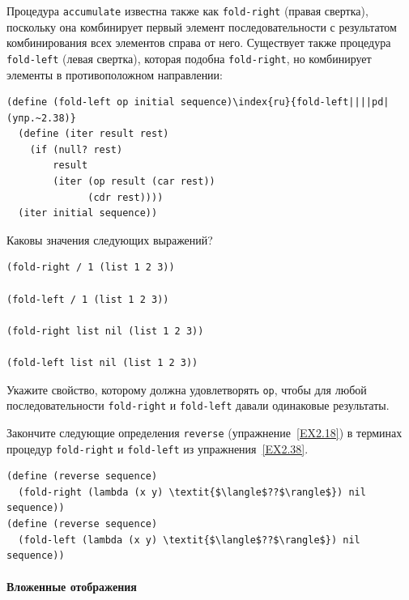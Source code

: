 \begin{exercise}{2.38}\label{EX2.38}%
Процедура
{\tt accumulate} известна также как
{\tt fold-right}
(правая свертка), поскольку она комбинирует
первый элемент последовательности с результатом комбинирования всех
элементов справа от него.  Существует также процедура
{\tt fold-left} (левая свертка), которая подобна
{\tt fold-right}, но комбинирует элементы в противоположном
направлении:

\begin{Verbatim}[fontsize=\small]
(define (fold-left op initial sequence)\index{ru}{fold-left||||pd|(упр.~2.38)}
  (define (iter result rest)
    (if (null? rest)
        result
        (iter (op result (car rest))
              (cdr rest))))
  (iter initial sequence))
\end{Verbatim}
Каковы значения следующих выражений?

\begin{Verbatim}[fontsize=\small]
(fold-right / 1 (list 1 2 3))

(fold-left / 1 (list 1 2 3))

(fold-right list nil (list 1 2 3))

(fold-left list nil (list 1 2 3))
\end{Verbatim}
Укажите свойство, которому должна удовлетворять {\tt op}, чтобы 
для любой последовательности {\tt fold-right} и
{\tt fold-left} давали одинаковые результаты.
\end{exercise}
\begin{exercise}{2.39}\label{EX2.39}%
Закончите следующие определения   {\tt reverse}
(упражнение~\ref{EX2.18}) в терминах процедур {\tt fold-right} 
и {\tt fold-left} из упражнения~\ref{EX2.38}.

\begin{Verbatim}[fontsize=\small]
(define (reverse sequence)
  (fold-right (lambda (x y) \textit{$\langle$??$\rangle$}) nil sequence))
(define (reverse sequence)
  (fold-left (lambda (x y) \textit{$\langle$??$\rangle$}) nil sequence))
\end{Verbatim}
\end{exercise}

\paragraph{Вложенные отображения}


